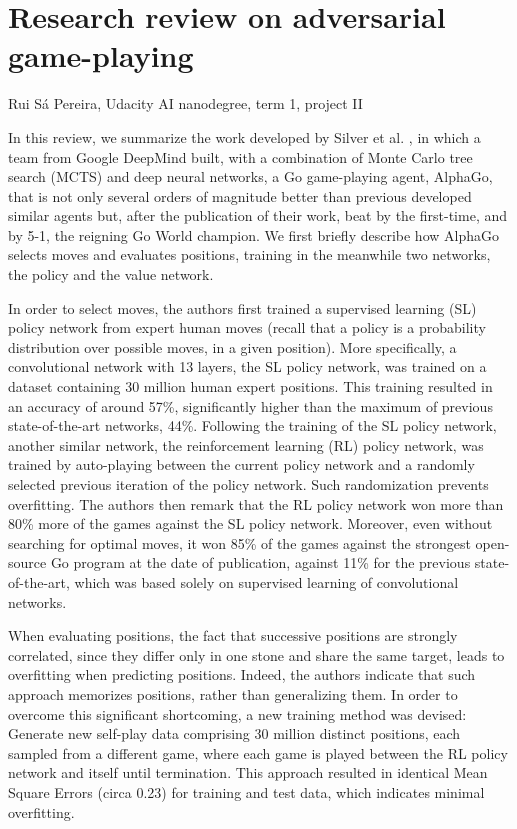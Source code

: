 \documentclass{report}
\begin{document}
\section*{Research review on adversarial game-playing }
\begin{center}
Rui S\'a Pereira, Udacity AI nanodegree, term 1, project II
\end{center}
In this review, we summarize the work developed by Silver et al. \cite{Go}, in which a team from Google DeepMind built, with a combination of Monte Carlo tree search (MCTS)  and deep neural networks, a Go game-playing agent, AlphaGo, that is not only several orders of magnitude better than previous developed similar agents but, after the publication of their work,  beat by the first-time, and by 5-1, the reigning Go World champion. We first briefly describe how AlphaGo selects  moves and evaluates positions,  training  in the meanwhile two networks, the policy and the value network. 

In order to select moves, the authors first trained a supervised  learning (SL) policy network  from expert human moves (recall that a policy is a probability distribution over possible moves, in a given position). More specifically,  a convolutional network with 13 layers, the SL policy network, was trained on a dataset containing  30 million human expert positions. This training resulted in an accuracy of  around 57\%, significantly higher than the maximum of previous state-of-the-art networks, 44\%. Following the training of the SL policy network, another similar network, the reinforcement learning (RL) policy network, was trained by auto-playing between the current policy network and a randomly selected previous iteration of the policy network. Such randomization prevents overfitting.
The authors then remark that  the RL policy network  won more than 80\% more of the games against the  SL policy network. Moreover, even without searching for optimal moves, it won 85\% of the games against the strongest open-source Go program at the date of publication, against 11\% for the previous state-of-the-art, which was based solely on supervised learning of convolutional networks.

When evaluating positions, the fact that successive positions are strongly correlated, since they differ only in one stone and share the same target, leads to overfitting when predicting positions. Indeed, the authors indicate that such approach memorizes positions, rather than generalizing them. In order to overcome this significant shortcoming, a new training method was devised: Generate new self-play data comprising 30 million distinct positions, each sampled from a different game, where each game is played between the RL policy network and itself until termination. This approach resulted in identical Mean Square Errors (circa 0.23) for training and test data, which indicates minimal overfitting. 
\end{document}
